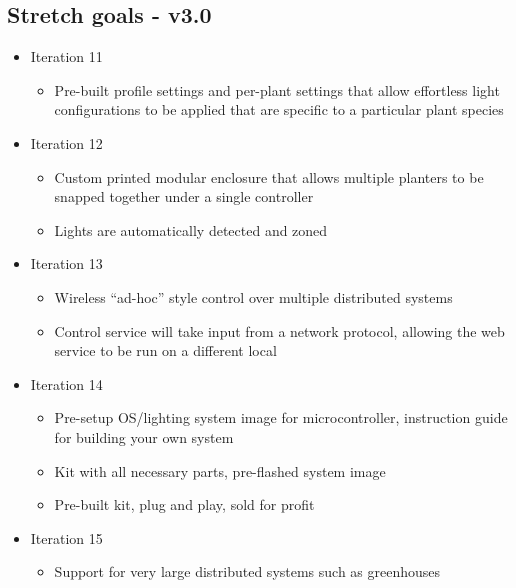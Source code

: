 \documentclass[onecolumn, draftclsnofoot,10pt, compsoc]{IEEEtran}
\begin{document}
		\subsection{Stretch goals - v3.0}
			\begin{itemize}
				\item Iteration 11
					\begin{itemize}
						\item Pre-built profile settings and per-plant settings that allow effortless light configurations to be applied that are specific to a particular plant species
					\end{itemize}
				\item Iteration 12
					\begin{itemize}
						\item Custom printed modular enclosure that allows multiple planters to be snapped together under a single controller
						\item Lights are automatically detected and zoned
					\end{itemize}
				\item Iteration 13
					\begin{itemize}
						\item Wireless “ad-hoc” style control over multiple distributed systems
						\item Control service will take input from a network protocol, allowing the web service to be run on a different local
					\end{itemize}
				\item Iteration 14
					\begin{itemize}
						\item Pre-setup OS/lighting system image for microcontroller, instruction guide for building your own system
						\item Kit with all necessary parts, pre-flashed system image
						\item Pre-built kit, plug and play, sold for profit
					\end{itemize}
				\item Iteration 15
					\begin{itemize}
						\item Support for very large distributed systems such as greenhouses
					\end{itemize}
			\end{itemize}
\end{document}
